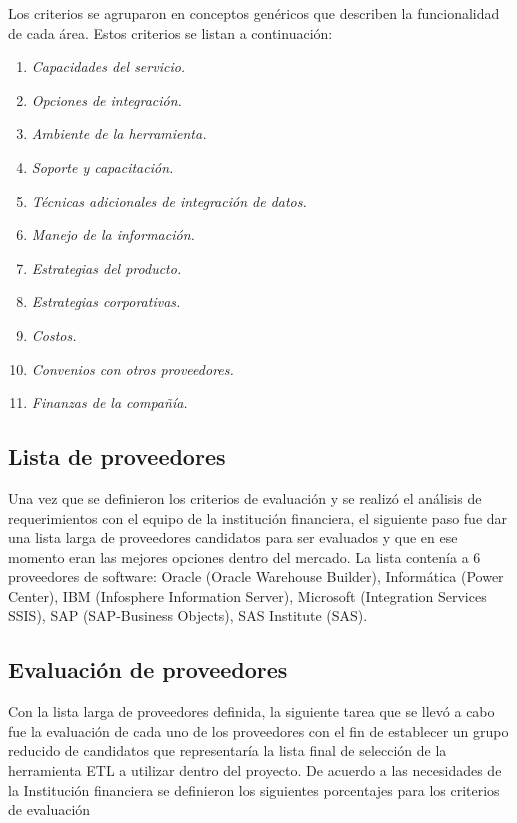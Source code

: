 Los criterios se agruparon en conceptos genéricos que describen la funcionalidad
de cada área. Estos criterios se listan a continuación:

\begin{enumerate}
\item \textit{Capacidades del servicio.}
\item \textit{Opciones de integración.}
\item \textit{Ambiente de la herramienta.}
\item \textit{Soporte y capacitación.}
\item \textit{Técnicas adicionales de integración de datos.}
\item \textit{Manejo de la información.}
\item \textit{Estrategias del producto.}
\item \textit{Estrategias corporativas.}
\item \textit{Costos.}
\item \textit{Convenios con otros proveedores.}
\item \textit{Finanzas de la compañía.}
\end{enumerate}

\subsection{Lista de proveedores}

Una vez que se definieron los criterios de evaluación y se realizó el análisis
de requerimientos con el equipo de la institución financiera, el siguiente paso
fue dar una lista larga de proveedores candidatos para ser evaluados y que en
ese momento eran las mejores opciones dentro del mercado. La lista contenía a 6
proveedores de software: Oracle (Oracle Warehouse Builder), Informática (Power
Center), IBM (Infosphere Information Server), Microsoft (Integration Services
SSIS), SAP (SAP-Business Objects), SAS Institute (SAS).

\subsection{Evaluación de proveedores}

Con la lista larga de proveedores definida, la siguiente tarea que se llevó a
cabo fue la evaluación de cada uno de los proveedores con el fin de establecer
un grupo reducido de candidatos que representaría la lista final de selección de
la herramienta ETL a utilizar dentro del proyecto. De acuerdo a las necesidades
de la Institución financiera se definieron los siguientes porcentajes para los
criterios de evaluación

